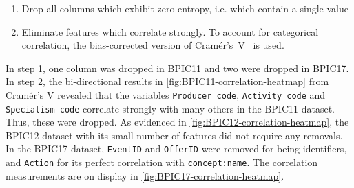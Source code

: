 \begin{enumerate}
    \item Drop all columns which exhibit zero entropy, i.e. which contain a single value
    \item Eliminate features which correlate strongly. To account for categorical correlation, the bias-corrected version of Cramér's~V~\cite{bergsma2013bias} is used.
\end{enumerate}

In step 1, one column was dropped in BPIC11 and two were dropped in BPIC17.
In step 2, the bi-directional results in \autoref{fig:BPIC11-correlation-heatmap} from Cramér's V revealed that the variables \texttt{Producer code}, \texttt{Activity code} and \texttt{Specialism code} correlate strongly with many others in the BPIC11 dataset. Thus, these were dropped. As evidenced in \autoref{fig:BPIC12-correlation-heatmap}, the BPIC12 dataset with its small number of features did not require any removals. In the BPIC17 dataset, \texttt{EventID} and \texttt{OfferID} were removed for being identifiers, and \texttt{Action} for its perfect correlation with \texttt{concept:name}. The correlation measurements are on display in \autoref{fig:BPIC17-correlation-heatmap}.

